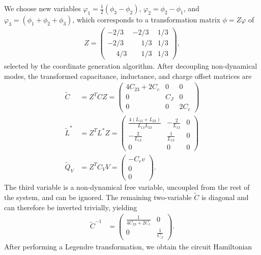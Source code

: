 We choose new variables $\varphi_1 = \frac{1}{2}(\phi_3-\phi_2)$, $\varphi_2 = \phi_2-\phi_1$, and $\varphi_3 = (\phi_1 + \phi_2+\phi_3)$, which corresponds to a transformation matrix $\phi = Z\varphi$ of
\begin{align}
    Z = \begin{pmatrix}
        -2/3 & -2/3 & 1/3 \\
        -2/3 & \phantom{-}1/3 & 1/3 \\
         \phantom{-}4/3 & \phantom{-}1/3 & 1/3
    \end{pmatrix},
\end{align}
selected by the coordinate generation algorithm. After decoupling non-dynamical modes, the transformed capacitance, inductance, and charge offset matrices are
\begin{subequations}
\begin{align}
    \tilde{C} &= Z^TCZ = \begin{pmatrix}
        4 C_{23} + 2C_c & 0 & 0 \\
        0 & C_J & 0 \\
        0 & 0 & 2 C_c
    \end{pmatrix} \\
    \tilde{L}^* &= Z^TL^*Z = \begin{pmatrix}
        \frac{4(L_{13} + L_{23})}{L_{13}L_{23}} & -\frac{2}{L_{13}} & 0 \\
        -\frac{2}{L_{13}} & \frac{1}{L_{13}} & 0 \\
        0 & 0 & 0
    \end{pmatrix} \\
    \tilde{Q}_V &= Z^T C_V V = \begin{pmatrix}
        -C_c v \\
        0 \\
        0
    \end{pmatrix}.
\end{align}
\end{subequations}
The third variable is a non-dynamical free variable, uncoupled from the rest of the system, and can be ignored. The remaining two-variable $\tilde{C}$ is diagonal and can therefore be inverted trivially, yielding
\begin{align}
    \tilde{C}^{-1} &=\begin{pmatrix}
        \frac{1}{4 C_{23} + 2C_c} & 0 \\
        0 & \frac{1}{C_J}
    \end{pmatrix}.
\end{align}
After performing a Legendre transformation, we obtain the circuit Hamiltonian

